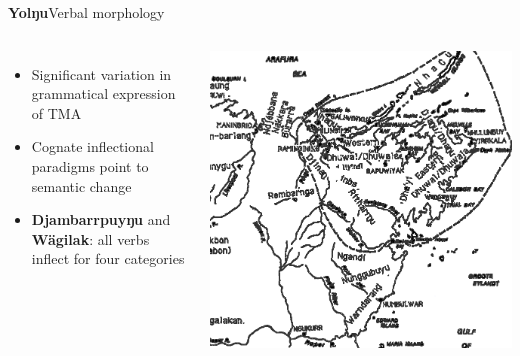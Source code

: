 \documentclass[dvipsnames]{beamer}%
\begin{document}
\begin{frame}{\textbf{Yolŋu}\hfill Verbal morphology}
\begin{columns}


	\begin{itemize}
	\item Significant variation in grammatical expression of TMA
	\item Cognate inflectional paradigms point to semantic change
	\item \textbf{Djambarrpuyŋu} and \textbf{Wägilak}: all verbs inflect for four categories
 	\end{itemize}
 
 \includegraphics[scale=.2]{YolnguWanga-MW}
\end{columns}
\end{frame}
\end{document}
